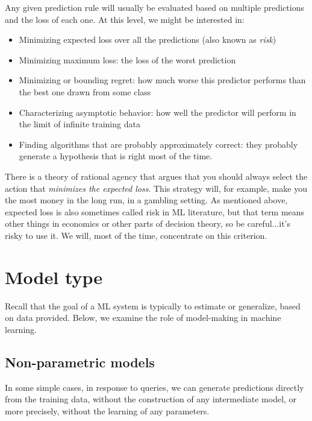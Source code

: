 Any given prediction rule will usually be evaluated based on multiple predictions and the loss of each one.  At this level, we might be interested in:
\begin{itemize}
  \item Minimizing expected loss over all the predictions (also known as {\em risk})
  \item Minimizing maximum loss: the loss of the worst prediction
  \item Minimizing or bounding regret: how much worse this predictor performs than the best one drawn from some class
  \item Characterizing asymptotic behavior: how well the predictor will perform in the limit of infinite training data
  \item Finding algorithms that are probably approximately correct:  they probably generate a hypothesis that is right most of the time.
\end{itemize}

There is a theory of rational agency that argues that you should
always select the action that {\em minimizes the expected loss}.  This
strategy will, for example, make you the most money in the long run,
in a gambling setting.  As mentioned above, expected loss is
also sometimes called risk in ML literature,
but that term means other things in economics or other parts of
decision theory, so be careful...it's risky to use it.  We will, most of the time, concentrate on this criterion.


\section{Model type}

Recall that the goal of a ML system is typically to
estimate or generalize, based on data provided.  Below, we examine the
role of model-making in machine learning.

\subsection{Non-parametric models}

In some simple cases, in response to queries, we can generate
predictions directly from the training data, without the construction
of any intermediate model, or more precisely, without the learning of any parameters. 

